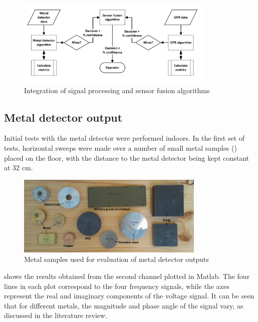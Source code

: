 \documentclass[main.tex]{subfiles}
\begin{document}
\begin{figure}[ht]
\includegraphics[width=0.85\textwidth]{3-ConceptDesign/fusion.PNG}
\centering
\caption{Integration of signal processing and sensor fusion algorithms} 
\end{figure}

\subsection{Metal detector output}
Initial tests with the metal detector were performed indoors. In the first set of tests, horizontal sweeps were made over a number of small metal samples () placed on the floor, with the distance to the metal detector being kept constant at 32 cm. 

\begin{figure}[ht]
\includegraphics[width=0.8\textwidth]{3-ConceptDesign/samples.jpg}
\centering
\caption{Metal samples used for evaluation of metal detector outputs} 
\end{figure}

 shows the results obtained from the second channel plotted in Matlab.    The four lines in each plot correspond to the four frequency signals, while the axes represent the real and imaginary components of the voltage signal. It can be seen that for different metals, the magnitude and phase angle of the signal vary, as discussed in the literature review. 
\end{document}
